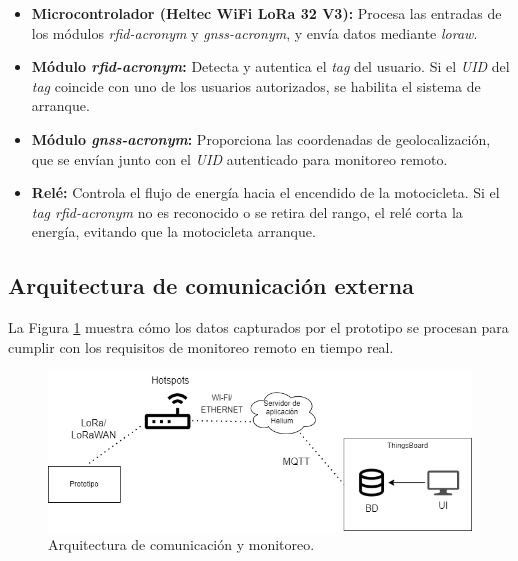 \begin{itemize}
    \item \textbf{Microcontrolador (Heltec WiFi LoRa 32 V3):} Procesa las entradas de los módulos \textit{\acrshort{rfid-acronym}} y \textit{\acrshort{gnss-acronym}}, y envía datos mediante \textit{\acrshort{loraw}}.
    \item \textbf{Módulo \textit{\acrshort{rfid-acronym}}:} Detecta y autentica el \textit{tag} del usuario. Si el \textit{UID} del \textit{tag} coincide con uno de los usuarios autorizados, se habilita el sistema de arranque.
    \item \textbf{Módulo \textit{\acrshort{gnss-acronym}}:} Proporciona las coordenadas de geolocalización, que se envían junto con el \textit{UID} autenticado para monitoreo remoto.
    \item \textbf{Relé:} Controla el flujo de energía hacia el encendido de la motocicleta. Si el \textit{tag \acrshort{rfid-acronym}} no es reconocido o se retira del rango, el relé corta la energía, evitando que la motocicleta arranque.
\end{itemize}

\subsection{Arquitectura de comunicación externa}

La Figura \ref{fig:diagrama2} muestra cómo los datos capturados por el prototipo se procesan para cumplir con los requisitos de monitoreo remoto en tiempo real.

\begin{figure}[H]
\leavevmode
\begin{minipage}{\textwidth}
\begin{center}
\includegraphics[scale=0.5]{./capitulo_04/imagen/diagrama2.png}
\caption{Arquitectura de comunicación y monitoreo. \label{fig:diagrama2}}
\end{center}
\end{minipage}
\end{figure}

